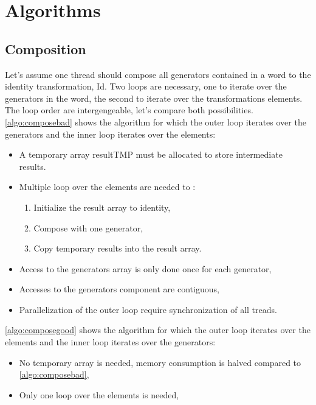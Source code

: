 {%

\section{ Algorithms}
\label{part:algo}
\subsection{Composition}
\label{part:compose}
Let's assume one thread should compose all generators contained in a word to the identity transformation, Id. 
Two loops are necessary, one to iterate over the generators in the word, the second to iterate over the transformations elements.
The loop order are intergengeable, let's compare both possibilities.
\autoref{algo:composebad} shows the algorithm for which the outer loop iterates over the generators and the inner loop iterates over the elements:
\begin{itemize}
\item A temporary array resultTMP must be allocated to store intermediate results.
\item Multiple loop over the elements are needed to :
\begin{enumerate}
 \item Initialize the result array to identity,
 \item Compose with one generator,
 \item Copy temporary results into the result array.
 \end{enumerate}
\item Access to the generators array is only done once for each generator,
 \item Accesses to the generators component are contiguous,
 \item Parallelization of the outer loop require synchronization of all treads.
\end{itemize}
\autoref{algo:composegood} shows the algorithm for which the outer loop iterates over the elements and the inner loop iterates over the generators:
\begin{itemize}
 \item No temporary array is needed, memory consumption is halved compared to \autoref{algo:composebad},
 \item Only one loop over the elements is needed,

\end{itemize}}
